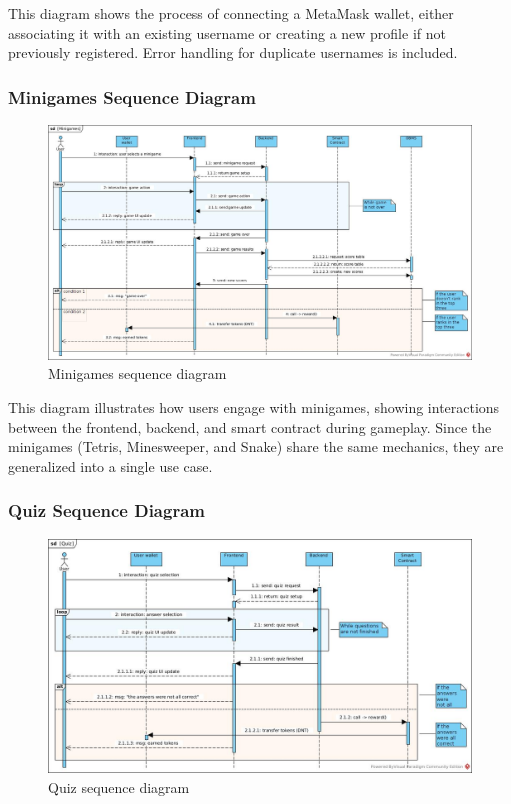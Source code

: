 \documentclass[../main.tex]{subfiles}
\begin{document}
This diagram shows the process of connecting a MetaMask wallet, either associating it with an existing username or creating a new profile if not previously registered. Error handling for duplicate usernames is included.


\subsubsection{Minigames Sequence Diagram}

\begin{figure}[H]
    \centering
    \includegraphics[width=\linewidth]{../src/diagrams/Minigames.jpg}
    \caption{Minigames sequence diagram}
    \label{fig:Minigames_seqDiag}
\end{figure}

This diagram illustrates how users engage with minigames, showing interactions between the frontend, backend, and smart contract during gameplay. Since the minigames (Tetris, Minesweeper, and Snake) share the same mechanics, they are generalized into a single use case.


\subsubsection{Quiz Sequence Diagram}

\begin{figure}[H]
    \centering
    \includegraphics[width=\linewidth]{../src/diagrams/Quiz.jpg}
    \caption{Quiz sequence diagram}
    \label{fig:Quiz_seqDiag}
\end{figure}
\end{document}
